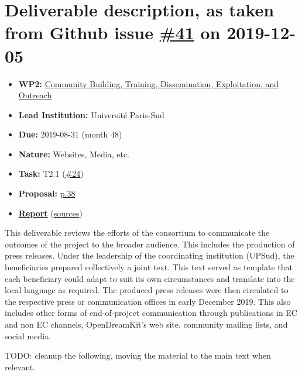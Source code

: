 \hypertarget{deliverable-description-as-taken-from-github-issue-41-on-2019-12-05}{%
\section*{\texorpdfstring{Deliverable description, as taken from Github
issue
\href{https://github.com/OpenDreamKit/OpenDreamKit/issues/41}{\#41} on
2019-12-05}{Deliverable description, as taken from Github issue \#41 on 2019-12-05}}\label{deliverable-description-as-taken-from-github-issue-41-on-2019-12-05}}

\begin{itemize}
\tightlist
\item
  \textbf{WP2:}
  \href{https://github.com/OpenDreamKit/OpenDreamKit/tree/master/WP2}{Community
  Building, Training, Dissemination, Exploitation, and Outreach}
\item
  \textbf{Lead Institution:} Université Paris-Sud
\item
  \textbf{Due:} 2019-08-31 (month 48)
\item
  \textbf{Nature:} Websites, Media, etc.
\item
  \textbf{Task:} T2.1
  (\href{https://github.com/OpenDreamKit/OpenDreamKit/issues/24}{\#24})
\item
  \textbf{Proposal:}
  \href{https://github.com/OpenDreamKit/OpenDreamKit/raw/master/Proposal/proposal-www.pdf}{p.38}
\item
  \textbf{\href{https://github.com/OpenDreamKit/OpenDreamKit/raw/master/WP2/D2.16/report-final.pdf}{Report}}
  (\href{https://github.com/OpenDreamKit/OpenDreamKit/raw/master/WP2/D2.16/}{sources})
\end{itemize}

This deliverable reviews the efforts of the consortium to communicate
the outcomes of the project to the broader audience. This includes the
production of press releases. Under the leadership of the coordinating
institution (UPSud), the beneficiaries prepared collectively a joint
text. This text served as template that each beneficiary could adapt to
suit its own circumstances and translate into the local language as
required. The produced press releases were then circulated to the
respective press or communication offices in early December 2019. This
also includes other forms of end-of-project communication through
publications in EC and non EC channels, OpenDreamKit's web site,
community mailing lists, and social media.

TODO: cleanup the following, moving the material to the main text when
relevant.

